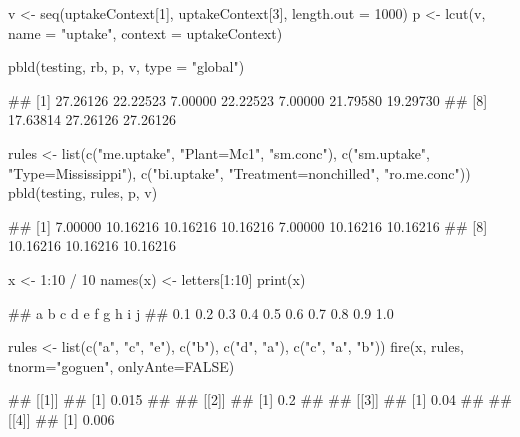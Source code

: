 \documentclass{article}\usepackage[]{graphicx}\usepackage[]{color}
\begin{document}
\begin{Schunk}
% --begin: "pbld5"
\begin{Sinput}
v <- seq(uptakeContext[1], uptakeContext[3], length.out = 1000)
p <- lcut(v, name = "uptake", context = uptakeContext)
\end{Sinput}
%
% --end: "pbld5"
\end{Schunk}

\begin{Schunk}
% --begin: "pbld6"
\begin{Sinput}
pbld(testing, rb, p, v, type = "global")
\end{Sinput}
\begin{Soutput}
##  [1] 27.26126 22.22523  7.00000 22.22523  7.00000 21.79580 19.29730
##  [8] 17.63814 27.26126 27.26126
\end{Soutput}
%
% --end: "pbld6"
\end{Schunk}

\begin{Schunk}
% --begin: "pbld_custom"
\begin{Sinput}
rules <- list(c("me.uptake", "Plant=Mc1", "sm.conc"),
              c("sm.uptake", "Type=Mississippi"),
              c("bi.uptake", "Treatment=nonchilled", "ro.me.conc"))
pbld(testing, rules, p, v)
\end{Sinput}
\begin{Soutput}
##  [1]  7.00000 10.16216 10.16216 10.16216  7.00000 10.16216 10.16216
##  [8] 10.16216 10.16216 10.16216
\end{Soutput}
%
% --end: "pbld_custom"
\end{Schunk}

\begin{Schunk}
% --begin: "fire"
\begin{Sinput}
x <- 1:10 / 10
names(x) <- letters[1:10]
print(x)
\end{Sinput}
\begin{Soutput}
##   a   b   c   d   e   f   g   h   i   j 
## 0.1 0.2 0.3 0.4 0.5 0.6 0.7 0.8 0.9 1.0
\end{Soutput}
\begin{Sinput}
rules <- list(c("a", "c", "e"),
              c("b"),
              c("d", "a"),
              c("c", "a", "b"))
fire(x, rules, tnorm="goguen", onlyAnte=FALSE)
\end{Sinput}
\begin{Soutput}
## [[1]]
## [1] 0.015
## 
## [[2]]
## [1] 0.2
## 
## [[3]]
## [1] 0.04
## 
## [[4]]
## [1] 0.006
\end{Soutput}
%
% --end: "fire"
\end{Schunk}
\end{document}
